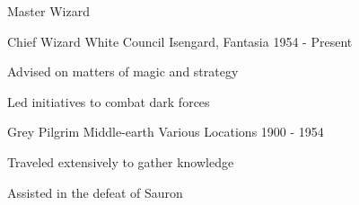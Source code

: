 \documentclass[11pt, a4paper]{awesome-cv}
\begin{document}
\vspace{4mm}
\begin{cvsubsection}{Master Wizard}
\vspace{2mm}
\begin{cvitems}
    \item{}
    \item{}
\end{cvitems}
\vspace{4mm}
\begin{cventries}

\vspace{4mm}
\cventry
{Chief Wizard}
{White Council}
{Isengard, Fantasia}
{1954 - Present} 
{
\begin{cvitems}
    \item{\normalsize Advised on matters of magic and strategy}
    \item{\normalsize Led initiatives to combat dark forces}
\end{cvitems}
}
\vspace{4mm}
\vspace{4mm}
\cventry
{Grey Pilgrim}
{Middle-earth}
{Various Locations}
{1900 - 1954} 
{
\begin{cvitems}
    \item{\normalsize Traveled extensively to gather knowledge}
    \item{\normalsize Assisted in the defeat of Sauron}
\end{cvitems}
}
\vspace{4mm}
\end{cventries}




\begin{cventries}


\end{cventries}
\end{cvsubsection}
\end{document}
